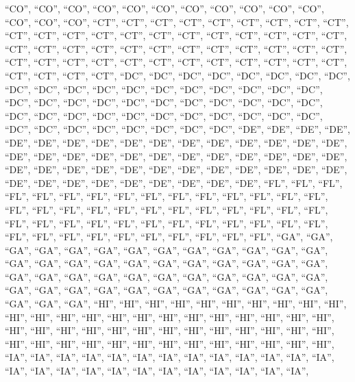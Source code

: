 \documentclass[
]{article}
\begin{document}
``CO'', ``CO'', ``CO'', ``CO'', ``CO'', ``CO'', ``CO'', ``CO'', ``CO'',
``CO'', ``CO'', ``CO'', ``CO'', ``CO'', ``CT'', ``CT'', ``CT'', ``CT'',
``CT'', ``CT'', ``CT'', ``CT'', ``CT'', ``CT'', ``CT'', ``CT'', ``CT'',
``CT'', ``CT'', ``CT'', ``CT'', ``CT'', ``CT'', ``CT'', ``CT'', ``CT'',
``CT'', ``CT'', ``CT'', ``CT'', ``CT'', ``CT'', ``CT'', ``CT'', ``CT'',
``CT'', ``CT'', ``CT'', ``CT'', ``CT'', ``CT'', ``CT'', ``CT'', ``CT'',
``CT'', ``CT'', ``CT'', ``CT'', ``CT'', ``CT'', ``CT'', ``CT'', ``CT'',
``DC'', ``DC'', ``DC'', ``DC'', ``DC'', ``DC'', ``DC'', ``DC'', ``DC'',
``DC'', ``DC'', ``DC'', ``DC'', ``DC'', ``DC'', ``DC'', ``DC'', ``DC'',
``DC'', ``DC'', ``DC'', ``DC'', ``DC'', ``DC'', ``DC'', ``DC'', ``DC'',
``DC'', ``DC'', ``DC'', ``DC'', ``DC'', ``DC'', ``DC'', ``DC'', ``DC'',
``DC'', ``DC'', ``DC'', ``DC'', ``DC'', ``DC'', ``DC'', ``DC'', ``DC'',
``DC'', ``DC'', ``DC'', ``DC'', ``DE'', ``DE'', ``DE'', ``DE'', ``DE'',
``DE'', ``DE'', ``DE'', ``DE'', ``DE'', ``DE'', ``DE'', ``DE'', ``DE'',
``DE'', ``DE'', ``DE'', ``DE'', ``DE'', ``DE'', ``DE'', ``DE'', ``DE'',
``DE'', ``DE'', ``DE'', ``DE'', ``DE'', ``DE'', ``DE'', ``DE'', ``DE'',
``DE'', ``DE'', ``DE'', ``DE'', ``DE'', ``DE'', ``DE'', ``DE'', ``DE'',
``DE'', ``DE'', ``DE'', ``DE'', ``DE'', ``DE'', ``DE'', ``DE'', ``FL'',
``FL'', ``FL'', ``FL'', ``FL'', ``FL'', ``FL'', ``FL'', ``FL'', ``FL'',
``FL'', ``FL'', ``FL'', ``FL'', ``FL'', ``FL'', ``FL'', ``FL'', ``FL'',
``FL'', ``FL'', ``FL'', ``FL'', ``FL'', ``FL'', ``FL'', ``FL'', ``FL'',
``FL'', ``FL'', ``FL'', ``FL'', ``FL'', ``FL'', ``FL'', ``FL'', ``FL'',
``FL'', ``FL'', ``FL'', ``FL'', ``FL'', ``FL'', ``FL'', ``FL'', ``FL'',
``FL'', ``FL'', ``FL'', ``GA'', ``GA'', ``GA'', ``GA'', ``GA'', ``GA'',
``GA'', ``GA'', ``GA'', ``GA'', ``GA'', ``GA'', ``GA'', ``GA'', ``GA'',
``GA'', ``GA'', ``GA'', ``GA'', ``GA'', ``GA'', ``GA'', ``GA'', ``GA'',
``GA'', ``GA'', ``GA'', ``GA'', ``GA'', ``GA'', ``GA'', ``GA'', ``GA'',
``GA'', ``GA'', ``GA'', ``GA'', ``GA'', ``GA'', ``GA'', ``GA'', ``GA'',
``GA'', ``GA'', ``GA'', ``GA'', ``GA'', ``GA'', ``GA'', ``HI'', ``HI'',
``HI'', ``HI'', ``HI'', ``HI'', ``HI'', ``HI'', ``HI'', ``HI'', ``HI'',
``HI'', ``HI'', ``HI'', ``HI'', ``HI'', ``HI'', ``HI'', ``HI'', ``HI'',
``HI'', ``HI'', ``HI'', ``HI'', ``HI'', ``HI'', ``HI'', ``HI'', ``HI'',
``HI'', ``HI'', ``HI'', ``HI'', ``HI'', ``HI'', ``HI'', ``HI'', ``HI'',
``HI'', ``HI'', ``HI'', ``HI'', ``HI'', ``HI'', ``HI'', ``HI'', ``HI'',
``HI'', ``HI'', ``IA'', ``IA'', ``IA'', ``IA'', ``IA'', ``IA'', ``IA'',
``IA'', ``IA'', ``IA'', ``IA'', ``IA'', ``IA'', ``IA'', ``IA'', ``IA'',
``IA'', ``IA'', ``IA'', ``IA'', ``IA'', ``IA'', ``IA'', ``IA'', ``IA'',
\end{document}
